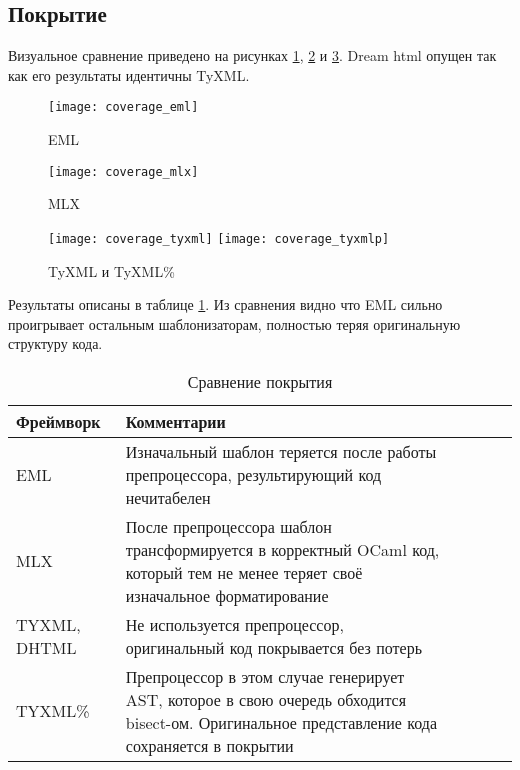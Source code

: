 \subsection{Покрытие}

Визуальное сравнение приведено на рисунках \ref{fig:coverage1}, \ref{fig:coverage2} и \ref{fig:coverage3}. Dream html опущен так как его результаты идентичны TyXML.

\begin{figure}[h!]
    \centering
    \texttt{[image: coverage\_eml]}\hfill
    \caption{EML}
    \label{fig:coverage1}
\end{figure}

\begin{figure}[h!]
    \centering
    \texttt{[image: coverage\_mlx]}\hfill
    \caption{MLX}
    \label{fig:coverage2}
\end{figure}
\begin{figure}[h!]
    \centering
    \texttt{[image: coverage\_tyxml]}\hfill
    \texttt{[image: coverage\_tyxmlp]}\hfill
    \caption{TyXML и TyXML\%}
    \label{fig:coverage3}
\end{figure}

Результаты описаны в таблице \ref{tab:coverage-comparison}. 
Из сравнения видно что EML сильно проигрывает остальным шаблонизаторам, полностью теряя оригинальную структуру кода.

\begin{table}[h!]
    \centering
    \begin{tabularx}{\linewidth}{l>{\raggedright\arraybackslash}X>{\raggedright\arraybackslash}XcXX}
        \toprule
        \textbf{Фреймворк} & \textbf{Комментарии} \\
        \midrule
        EML & \cellcolor{yellow!30} Изначальный шаблон теряется после работы препроцессора, результирующий код нечитабелен \\
        MLX & После препроцессора шаблон трансформируется в корректный OCaml код, который тем не менее теряет своё изначальное форматирование  \\
        TYXML, DHTML & Не используется препроцессор, оригинальный код покрывается без потерь \\
        TYXML\% & Препроцессор в этом случае генерирует AST, которое в свою очередь обходится bisect-ом. Оригинальное представление кода сохраняется в покрытии \\
        \bottomrule
    \end{tabularx}
    \caption{Сравнение покрытия}
    \label{tab:coverage-comparison}
\end{table}

